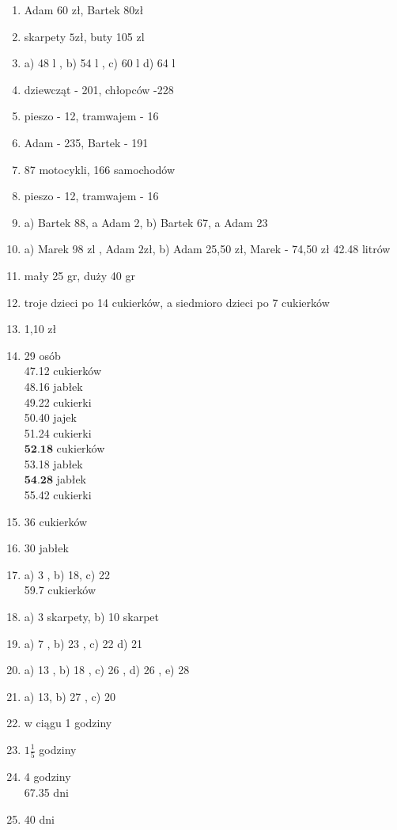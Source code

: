 \documentclass[10pt]{article}
\begin{document}
\begin{enumerate}
  \item Adam 60 zł, Bartek \(80 \mathrm{zł}\)
  \item skarpety \(5 \mathrm{zł}\), buty 105 zl
  \item a) 48 l , b) 54 l , c) 60 l d) 64 l
  \item dziewcząt - 201, chłopców -228
  \item pieszo - 12, tramwajem - 16
  \item Adam - 235, Bartek - 191
  \item 87 motocykli, 166 samochodów
  \item pieszo - 12, tramwajem - 16
  \item a) Bartek 88, a Adam 2, b) Bartek 67, a Adam 23
  \item a) Marek 98 zl , Adam \(2 \mathrm{zł}\), b) Adam 25,50 zł, Marek - 74,50 zł 42.48 litrów
  \item mały 25 gr, duży 40 gr
  \item troje dzieci po 14 cukierków, a siedmioro dzieci po 7 cukierków
  \item 1,10 zł
  \item 29 osób\\
47.12 cukierków\\
48.16 jabłek\\
49.22 cukierki\\
50.40 jajek\\
51.24 cukierki\\
\(\mathbf{5 2 . 1 8}\) cukierków\\
53.18 jabłek\\
\(\mathbf{5 4 . 2 8}\) jabłek\\
55.42 cukierki
  \item 36 cukierków
  \item 30 jabłek
  \item a) 3 , b) 18, c) 22\\
59.7 cukierków
  \item a) 3 skarpety, b) 10 skarpet
  \item a) 7 , b) 23 , c) 22 d) 21
  \item a) 13 , b) 18 , c) 26 , d) 26 , e) 28
  \item a) 13, b) 27 , c) 20
  \item w ciągu 1 godziny
  \item \(1 \frac{1}{5}\) godziny
  \item 4 godziny\\
67.35 dni
  \item 40 dni
\end{enumerate}
\end{document}

